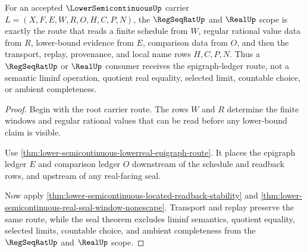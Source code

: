 \begin{theorem}
\label{thm:lower-semicontinuous-real-regseqrat-scope}
For an accepted $\LowerSemicontinuousUp$ carrier
$L=(X,F,E,W,R,O,H,C,P,N)$, the $\RegSeqRatUp$ and $\RealUp$ scope is exactly the
route that reads a finite schedule from $W$, regular rational value data from
$R$, lower-bound evidence from $E$, comparison data from $O$, and then the
transport, replay, provenance, and local name rows $H,C,P,N$. Thus a
$\RegSeqRatUp$ or $\RealUp$ consumer receives the epigraph-ledger route, not a
semantic liminf operation, quotient real equality, selected limit, countable
choice, or ambient completeness.
\end{theorem}
\begin{proof}
Begin with the root carrier route. The rows $W$ and $R$ determine the finite
windows and regular rational values that can be read before any lower-bound
claim is visible.

Use \autoref{thm:lower-semicontinuous-lowerreal-epigraph-route}. It places the
epigraph ledger $E$ and comparison ledger $O$ downstream of the schedule and
readback rows, and upstream of any real-facing seal.

Now apply \autoref{thm:lower-semicontinuous-located-readback-stability} and
\autoref{thm:lower-semicontinuous-real-seal-window-nonescape}. Transport and replay
preserve the same route, while the seal theorem excludes liminf semantics,
quotient equality, selected limits, countable choice, and ambient completeness
from the $\RegSeqRatUp$ and $\RealUp$ scope.
\end{proof}

